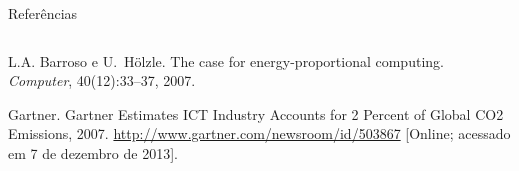\documentclass[final]{beamer}
\begin{document}
\begin{frame}[t]
\begin{columns}[t]
\begin{column}{0.61\paperwidth}

\end{column}
\end{columns}

\begin{block}{Referências}
\begin{columns}[t] 
	\begin{column}{0.35\columnwidth}

			\footnotesize{\begin{thebibliography}{99}
			L.A. Barroso e U.~H\"olzle.
			The case for energy-proportional computing.
			{\em Computer}, 40(12):33--37, 2007.

			Gartner.
			{Gartner Estimates ICT Industry Accounts for 2 Percent of Global CO2
			  Emissions}, 2007. \url{http://www.gartner.com/newsroom/id/503867}
			[Online; acessado em 7 de dezembro de 2013].

			\end{thebibliography}}

		

\end{column}
\end{columns}
\end{block}
\end{frame}
\end{document}

